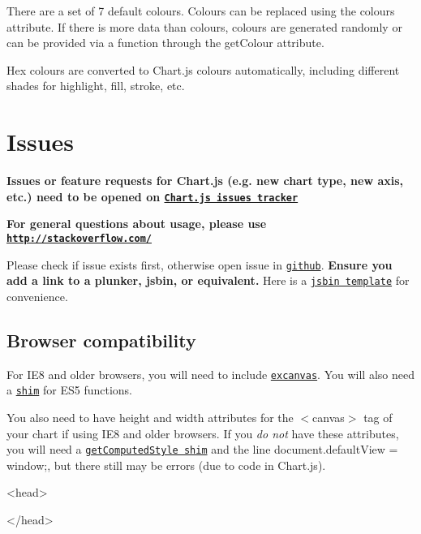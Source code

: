 There are a set of 7 default colours. Colours can be replaced using the {\ttfamily colours} attribute. If there is more data than colours, colours are generated randomly or can be provided via a function through the {\ttfamily get\+Colour} attribute.

Hex colours are converted to Chart.\+js colours automatically, including different shades for highlight, fill, stroke, etc.

\section*{Issues}

{\bfseries Issues or feature requests for Chart.\+js (e.\+g. new chart type, new axis, etc.) need to be opened on \href{https://github.com/nnnick/Chart.js/issues}{\tt Chart.\+js issues tracker}}

{\bfseries For general questions about usage, please use \href{http://stackoverflow.com/}{\tt http\+://stackoverflow.\+com/}}

Please check if issue exists first, otherwise open issue in \href{https://github.com/jtblin/angular-chart.js/issues}{\tt github}. {\bfseries Ensure you add a link to a plunker, jsbin, or equivalent.} Here is a \href{http://jsbin.com/dufibi/3/edit?html,js,output}{\tt jsbin template} for convenience.

\subsection*{Browser compatibility}

For I\+E8 and older browsers, you will need to include \href{https://code.google.com/p/explorercanvas/wiki/Instructions}{\tt excanvas}. You will also need a \href{https://github.com/es-shims/es5-shim}{\tt shim} for E\+S5 functions.

You also need to have {\ttfamily height} and {\ttfamily width} attributes for the {\ttfamily $<$canvas$>$} tag of your chart if using I\+E8 and older browsers. If you {\itshape do not} have these attributes, you will need a \href{https://github.com/Financial-Times/polyfill-service/blob/master/polyfills/getComputedStyle/polyfill.js}{\tt get\+Computed\+Style shim} and the line {\ttfamily document.\+default\+View = window;}, but there still may be errors (due to code in Chart.\+js).


\begin{DoxyCode}
<head>

</head>
\end{DoxyCode}


